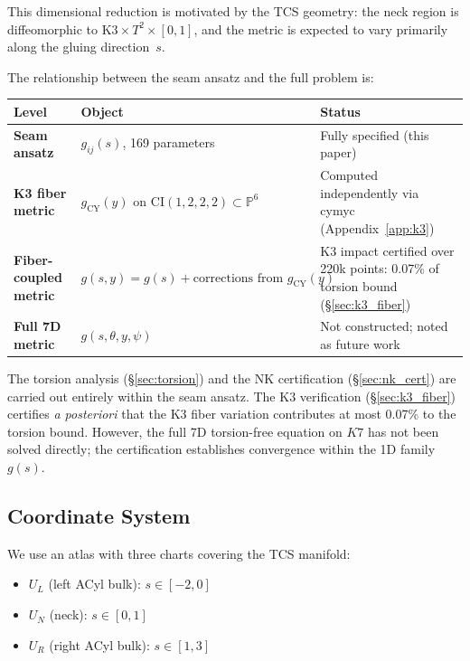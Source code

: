 \documentclass[11pt,a4paper]{article}
\newcommand{\Kseven}{K_7}
\theoremstyle{remark}
\def\Kseven{K7}%
\begin{document}
This dimensional reduction is motivated by the TCS geometry: the neck region is
diffeomorphic to $\mathrm{K3} \times T^2 \times [0, 1]$, and the metric is expected to vary primarily
along the gluing direction~$s$.

The relationship between the seam ansatz and the full problem is:

\begin{table}[H]
\centering
\small
\begin{tabular}{p{3.5cm}p{4.5cm}p{7.5cm}}
\toprule
\textbf{Level} & \textbf{Object} & \textbf{Status} \\
\midrule
\textbf{Seam ansatz} & $g_{ij}(s)$, 169 parameters & Fully specified (this paper) \\[0.3em]
\textbf{K3 fiber metric} & $g_{\mathrm{CY}}(y)$ on $\mathrm{CI}(1,2,2,2) \subset \mathbb{P}^6$ & Computed independently via cymyc~\cite{cymyc} (Appendix~\ref{app:k3}) \\[0.3em]
\textbf{Fiber-coupled metric} & $g(s, y) = g(s) + \text{corrections from } g_{\mathrm{CY}}(y)$ & K3 impact certified over 220k points: 0.07\% of torsion bound (\S\ref{sec:k3_fiber}) \\[0.3em]
\textbf{Full 7D metric} & $g(s, \theta, y, \psi)$ & Not constructed; noted as future work \\
\bottomrule
\end{tabular}
\end{table}

The torsion analysis (\S\ref{sec:torsion}) and the NK certification (\S\ref{sec:nk_cert}) are carried out entirely
within the seam ansatz. The K3 verification (\S\ref{sec:k3_fiber}) certifies \textit{a posteriori} that
the K3 fiber variation contributes at most 0.07\% to the torsion bound. However,
the full 7D torsion-free equation on $\Kseven$ has not been solved directly; the
certification establishes convergence within the 1D family $g(s)$.

\subsection{Coordinate System}\label{sec:coordinates}

We use an atlas with three charts covering the TCS manifold:
\begin{itemize}
    \item $U_L$ (left ACyl bulk): $s \in [-2, 0]$
    \item $U_N$ (neck): $s \in [0, 1]$
    \item $U_R$ (right ACyl bulk): $s \in [1, 3]$
\end{itemize}
\end{document}
